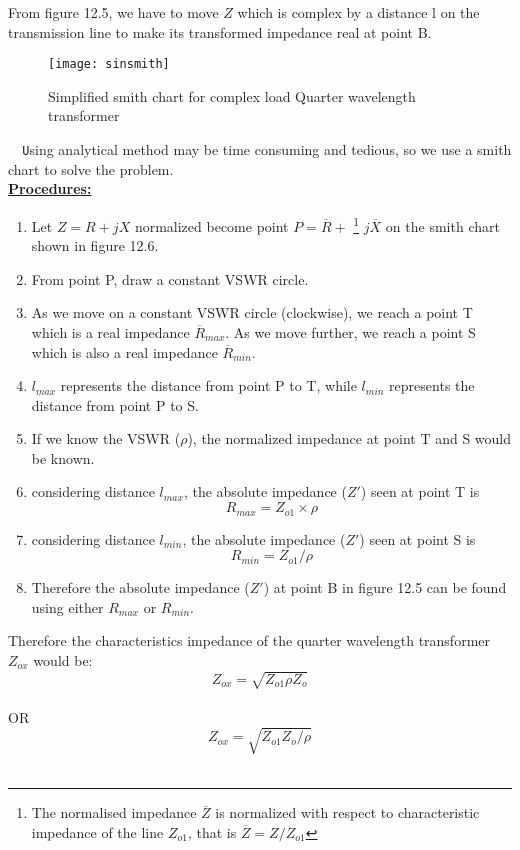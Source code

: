  	  From figure 12.5, we have to move $ Z$ which is complex by a distance l on the transmission line to make its transformed impedance real at point B.\\%
 	 \begin{figure}[h]
 	 	\centering
 	 	\texttt{[image: sinsmith]}
 	 	\caption{ Simplified smith chart for complex load Quarter wavelength transformer }
 	 \end{figure}
 	 \verb|  U|sing analytical method may be time consuming and tedious, so we use a smith chart to solve the problem.\\ 
 	\underline{\textbf{ Procedures:}}
 	\begin{enumerate}
 		\item Let $ Z = R + jX$ normalized become point $ P= \overline{R} +$ \footnote{The normalised impedance $ \overline{Z}$ is normalized with respect to characteristic impedance of the line $ Z_{o1}$, that is $ \overline{Z} = Z/ Z_{o1}$} $j\overline{X}$  on the smith chart shown in figure 12.6.
 		\item  From point P, draw a constant VSWR circle.
 		\item As we move on a constant VSWR circle (clockwise), we reach a point T which is a real impedance $\overline{R}_{max}$. As we move further, we reach a point S which is also a real impedance $\overline{R}_{min}$.
 		\item $ l_{max}$ represents the distance from point P to T, while $ l_{min}$ represents the distance from point P to S.
 		\item If we know the VSWR ($\rho$), the normalized impedance at point T and S would be known.
 		\item considering distance  $ l_{max}$, the absolute impedance ($ Z'$) seen at point T is \begin{equation}R_{max} = Z_{o1}\times\rho
 		\end{equation}
 		\item considering distance  $ l_{min}$, the absolute impedance ($ Z'$) seen at point S is\begin{equation} R_{min} = Z_{o1}/\rho\end{equation}
 		\item Therefore the absolute impedance ($Z'$) at point B in figure 12.5 can be found using either $ R_{max}$ or $ R_{min}$.
 	\end{enumerate}
 
  Therefore the characteristics impedance of the quarter wavelength transformer $Z_{ox}$ would be: 
 \begin{equation}
 \boxed{Z_{ox}=\sqrt{Z_{o1}\rho Z_o}} 
 \end{equation}
 \\OR
 \begin{equation}
\boxed{Z_{ox}=\sqrt{Z_{o1}Z_o/\rho}}
\end{equation}\\

